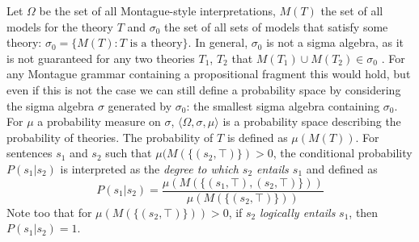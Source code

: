 \documentclass[a4paper,11pt]{article}
\theoremstyle{definition}
\begin{document}
Let $\Omega$ be the set of all Montague-style interpretations,  $M(T)$ the set of all models for the theory $T$ and
$\sigma_0$ the set of all sets of models that satisfy some theory: $\sigma_0 = \{M(T) : T\text{ is a theory}\}$.
In general, $\sigma_0$ is not a sigma algebra, as it is not
guaranteed for any two theories $T_1$, $T_2$ that
$M(T_1)\cup M(T_2) \in \sigma_0$ . For any Montague grammar containing a propositional
fragment  this would hold, but even if this is not the case we
can still define a probability space by considering the sigma algebra
$\sigma$ generated by $\sigma_0$: the smallest
sigma algebra containing $\sigma_0$. For $\mu$ a probability measure on $\sigma$, 
$\langle\Omega,\sigma,\mu\rangle$ is a probability space
describing the probability of theories. The probability of $T$ is defined as
$\mu(M(T))$. For  sentences $s_1$ and $s_2$ such that $\mu(M(\{(s_2,\top)\}) >0$, the conditional
probability $P(s_1 | s_2 )$  is interpreted as the {\em degree to which $s_2$ entails $s_1$\/} and defined as
$$ P(s_1|s_2) = \frac{\mu(M(\{(s_1, \top), (s_2, \top)\}))}{\mu(M(\{(s_2,\top)\}))}$$
Note too that for $\mu(M(\{(s_2,\top)\})) > 0$, if $s_2$ {\em logically entails\/} $s_1$, then
$P(s_1|s_2) = 1$.





\end{document}

